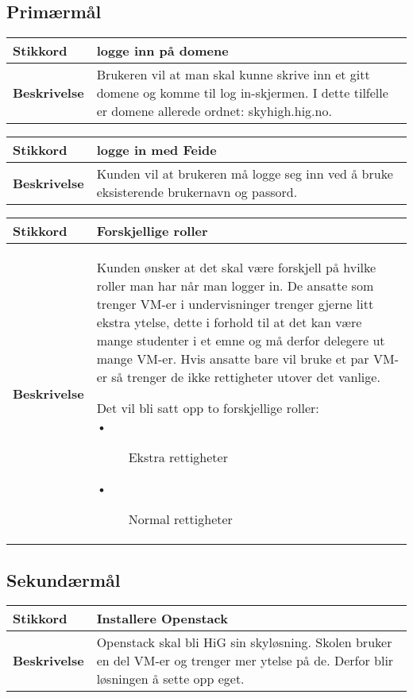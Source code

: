 \subsection{Primærmål}
\begin{table}[H]
	\begin{tabular}[Figur 2]{| p{2cm} p{9cm} |}
		\hline \textbf{Stikkord} & logge inn på domene \\
		\hline \textbf{Beskrivelse} & Brukeren vil at man skal kunne skrive inn et gitt domene og komme til log in-skjermen. I dette tilfelle er domene allerede ordnet: skyhigh.hig.no.
	\end{tabular}
\end{table}

\begin{table}[H]
	\begin{tabular}[Figur 2]{| p{2cm} p{9cm} |}
		\hline \textbf{Stikkord} & logge in med Feide\\
		\hline \textbf{Beskrivelse} & Kunden vil at brukeren må logge seg inn ved å bruke eksisterende brukernavn og passord. 
	\end{tabular}
\end{table}

\begin{table}[H]
	\begin{tabular}[Figur 2]{| p{2cm} p{9cm} |}
		\hline \textbf{Stikkord} & Forskjellige roller\\
		\hline \textbf{Beskrivelse} & Kunden ønsker at det skal være forskjell på hvilke roller man har når man logger in. De ansatte som trenger VM-er i undervisninger trenger gjerne litt ekstra ytelse, dette i forhold til at det kan være mange studenter i et emne og må derfor delegere ut mange VM-er. Hvis ansatte bare vil bruke et par VM-er så trenger de ikke rettigheter utover det vanlige.
		\begin{description}
			\item[Det vil bli satt opp to forskjellige roller:]
			\item[\tab •] Ekstra rettigheter
			\item[\tab •] Normal rettigheter
		\end{description}		 
	\end{tabular}
\end{table}

\subsection{Sekundærmål}
\begin{table}[H]
	\begin{tabular}[Figur 2]{| p{2cm} p{9cm} |}
		\hline \textbf{Stikkord} & Installere Openstack \\
		\hline \textbf{Beskrivelse} & Openstack skal bli HiG sin skyløsning. Skolen bruker en del VM-er og trenger mer ytelse på de. Derfor blir løsningen å sette opp eget. 
	\end{tabular}
\end{table}

